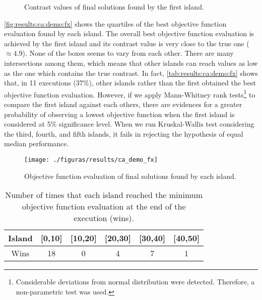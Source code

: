 			\begin{figure}
				\centering
				\caption[CA's demonstration study: contrast values of final solutions found by the first island]{Contrast values of final solutions found by the first island.}
				\label{fig:results:ca:demo:x}
			\end{figure}
		
			\autoref{fig:results:ca:demo:fx} shows the quartiles of the best objective function evaluation found by each island. The overall best objective function evaluation is achieved by the first island and its contrast value is very close to the true one ($\approx 4.9$). None of the boxes seems to vary from each other. There are many intersections among them, which means that other islands can reach values as low as the one which contains the true contrast. In fact, \autoref{tab:results:ca:demo:fx} shows that, in 11 executions (37\%), other islands rather than the first obtained the best objective function evaluation. However, if we apply Mann-Whitney rank tests\footnote{Considerable deviations from normal distribution were detected. Therefore, a non-parametric test was used.} to compare the first island against each others, there are evidences for a greater probability of observing a lowest objective function when the first island is considered at 5\% significance level. When we run Kruskal-Wallis test considering the third, fourth, and fifth islands, it fails in rejecting the hypothesis of equal median performance.
			
			\begin{figure}
				\centering
				\texttt{[image: ./figuras/results/ca\_demo\_fx]}
				\caption[CA's demonstration study: objective function evaluation of final solutions found by each island.]{Objective function evaluation of final solutions found by each island.}
				\label{fig:results:ca:demo:fx}
			\end{figure}
		
			\begin{table}
				\centering
				\def\arraystretch{1.5}
				\caption[CA's demonstration study: number of wins of each island.]{Number of times that each island reached the minimum objective function evaluation at the end of the execution (wins).}
				\begin{tabular}{cccccc}
					Island & [0,10] & [10,20] & [20,30] & [30,40] & [40,50] \\\hline
					Wins & 18 & 0 & 4 & 7 & 1
				\end{tabular}
				\label{tab:results:ca:demo:fx}
			\end{table}
		
